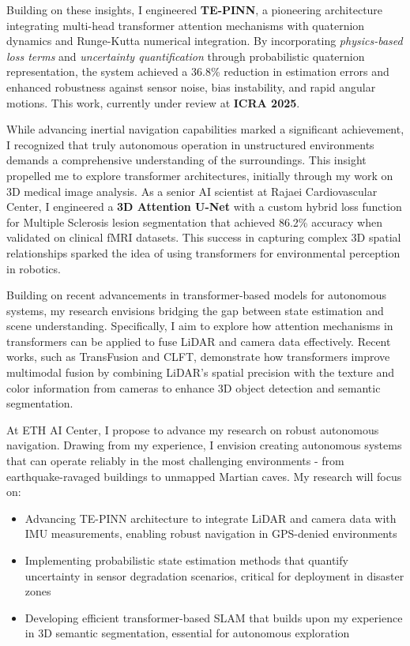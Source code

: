 \documentclass[12pt]{article}
\begin{document}
Building on these insights, I engineered \textbf{TE-PINN}, a pioneering architecture integrating multi-head transformer attention mechanisms with quaternion dynamics and Runge-Kutta numerical integration. By incorporating \emph{physics-based loss terms} and \emph{uncertainty quantification} through probabilistic quaternion representation, the system achieved a 36.8\% reduction in estimation errors and enhanced robustness against sensor noise, bias instability, and rapid angular motions. This work, currently under review at \textbf{ICRA 2025}.

While advancing inertial navigation capabilities marked a significant achievement, I recognized that truly autonomous operation in unstructured environments demands a comprehensive understanding of the surroundings. This insight propelled me to explore transformer architectures, initially through my work on 3D medical image analysis. As a senior AI scientist at Rajaei Cardiovascular Center, I engineered a \textbf{3D Attention U-Net} with a custom hybrid loss function for Multiple Sclerosis lesion segmentation that achieved 86.2\% accuracy when validated on clinical fMRI datasets. This success in capturing complex 3D spatial relationships sparked the idea of using transformers for environmental perception in robotics.

Building on recent advancements in transformer-based models for autonomous systems, my research envisions bridging the gap between state estimation and scene understanding. Specifically, I aim to explore how attention mechanisms in transformers can be applied to fuse LiDAR and camera data effectively. Recent works, such as TransFusion and CLFT, demonstrate how transformers improve multimodal fusion by combining LiDAR's spatial precision with the texture and color information from cameras to enhance 3D object detection and semantic segmentation.

At ETH AI Center, I propose to advance my research on robust autonomous navigation. Drawing from my experience, I envision creating autonomous systems that can operate reliably in the most challenging environments - from earthquake-ravaged buildings to unmapped Martian caves. My research will focus on:

\begin{itemize}
    \item Advancing TE-PINN architecture to integrate LiDAR and camera data with IMU measurements, enabling robust navigation in GPS-denied environments
    \item Implementing probabilistic state estimation methods that quantify uncertainty in sensor degradation scenarios, critical for deployment in disaster zones
    \item Developing efficient transformer-based SLAM that builds upon my experience in 3D semantic segmentation, essential for autonomous exploration
\end{itemize}
\end{document}
